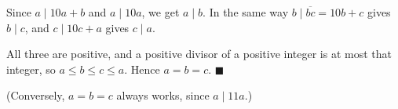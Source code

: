 Since $a\mid 10a+b$ and $a\mid10a$, we get $a\mid b$. In the same way $b\mid\overline{bc}=10b+c$ gives $b\mid c$, and $c\mid 10c+a$ gives $c\mid a$.

All three are positive, and a positive divisor of a positive integer is at most that integer, so $a\le b\le c\le a$. Hence $a=b=c$. $\blacksquare$

(Conversely, $a=b=c$ always works, since $a\mid 11a$.)
